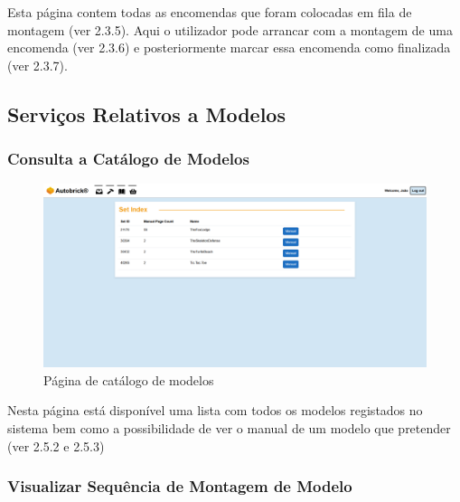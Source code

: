                     Esta página contem todas as encomendas que foram colocadas em fila de montagem (ver 2.3.5). Aqui o utilizador pode arrancar com a montagem de uma encomenda (ver 2.3.6) e posteriormente marcar essa encomenda como finalizada (ver 2.3.7).


            \subsection{Serviços Relativos a Modelos}
                \subsubsection{Consulta a Catálogo de Modelos} %

                    \begin{figure}[h!]
                        \centering
                        \includegraphics[width=0.8\linewidth, frame]{images/Site/Set Index.pdf}
                        \caption{Página de catálogo de modelos}
                        \label{fig:Página de catálogo de modelos}
                    \end{figure}

                    Nesta página está disponível uma lista com todos os modelos registados no sistema bem como a possibilidade de ver o manual de um modelo que pretender (ver 2.5.2 e 2.5.3)

                    
                \subsubsection{Visualizar Sequência de Montagem de Modelo}
                    
